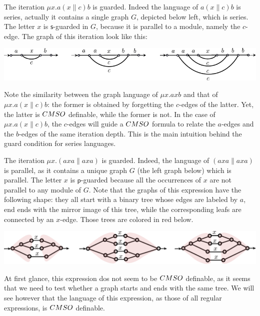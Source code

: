 \begin{example} The iteration $\mu x. a(x\parallel c)b$ is guarded. Indeed the language of $a(x\parallel c)b$ is series, actually it contains a single graph $G$, depicted below left, which is series. The letter $x$ is $\mathsf{s}$-guarded in $G$, because it is parallel to a module, namely the $c$-edge.   The graph of this iteration look like this:
\begin{center}
\includegraphics[scale=1]{Pictures/expl1.pdf}
\end{center}
\end{example}


Note the similarity between the graph language of $\mu x. axb$ and that of $\mu x. a(x\parallel c)b$: the former is obtained by forgetting the $c$-edges of the latter. Yet, the latter is $\CMSO$ definable, while the former is not. In the case of $\mu x. a(x\parallel c)b$, the $c$-edges will guide a $\CMSO$ formula to relate the $a$-edges and the $b$-edges of the same iteration depth.  This is the main intuition behind the guard condition for series languages.  
 \begin{example}
The iteration $\mu x. (axa\parallel axa)$ is guarded. Indeed, the language of $(axa\parallel axa)$ is parallel, as it contains a unique graph $G$ (the left graph below) which is parallel. The letter $x$ is $\mathsf{p}$-guarded because all the occurrences of $x$ are not parallel to any module of $G$.
Note that the graphs of this expression have the following shape: they all start with  a binary tree whose edges are labeled by $a$, end ends with the mirror image of this tree, while the corresponding leafs are connected by an $x$-edge.  Those trees are colored in red below. 
\begin{center}
\includegraphics[scale=.35]{Pictures/TxT.pdf}
\end{center}
At first glance, this expression dos not seem to be $\CMSO$ definable, as it seems that we need to test whether a graph starts and ends with the same tree. We will see however that the language of this expression, as those of all regular expressions, is $\CMSO$ definable.  
\end{example}

